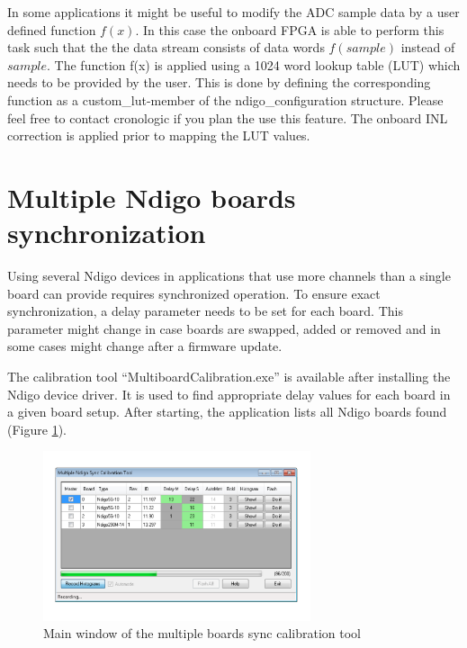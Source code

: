 		In some applications it might be useful to modify the ADC sample data by a user defined function $f(x)$. In this case the onboard FPGA is able to perform this task such that the the data stream consists of data words $f(sample)$ instead of $sample$. The function f(x) is applied using a 1024 word lookup table (LUT) which needs to be provided by the user. This is done by defining the corresponding function as a custom\_lut-member of the ndigo\_configuration structure. Please feel free to contact cronologic if you plan the use this feature. The onboard INL correction is applied prior to mapping the LUT values.  
	
\section{Multiple Ndigo boards synchronization}
	Using several Ndigo devices in applications that use more channels than a single board can provide requires synchronized operation. To ensure exact synchronization, a delay parameter needs to be set for each board. This parameter might change in case boards are swapped, added or removed and in some cases might change after a firmware update.\par
	
	The calibration tool ``MultiboardCalibration.exe'' is available after installing the Ndigo device driver. It is used to find appropriate delay values for each board in a given board setup. After starting, the application lists all Ndigo boards found (Figure \ref{fig:SyncCalibTool}).\par

	\begin{figure}[ht]
		\begin{center}
			\includegraphics[width=0.7\textwidth]{figures/SyncCalibTool.pdf}
			\caption{Main window of the multiple boards sync calibration tool\label{fig:SyncCalibTool}}
		\end{center}
	\end{figure}

